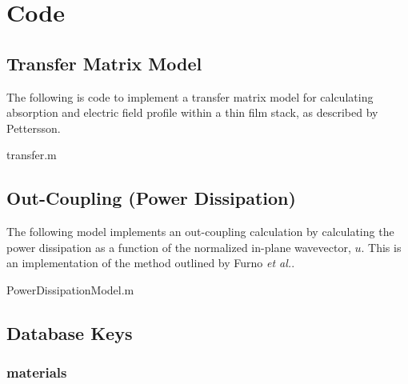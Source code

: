\documentclass[../thesis.tex]{subfiles}
\begin{document}
\chapter{Code}\label{sec:code}
\section{Transfer Matrix Model}
The following is code to implement a transfer matrix model for calculating absorption and electric field profile within a thin film stack, as described by Pettersson.\supercite{Pettersson1999}

transfer.m


\section{Out-Coupling (Power Dissipation)}\label{sec:outCoupling_code}
The following model implements an out-coupling calculation by calculating the power dissipation as a function of the normalized in-plane wavevector, $u$.  
This is an implementation of the method outlined by Furno \textit{et al.}.\supercite{Furno2010,Furno2012}

PowerDissipationModel.m


\section{Database Keys}
\subsection{materials}
\end{document}
